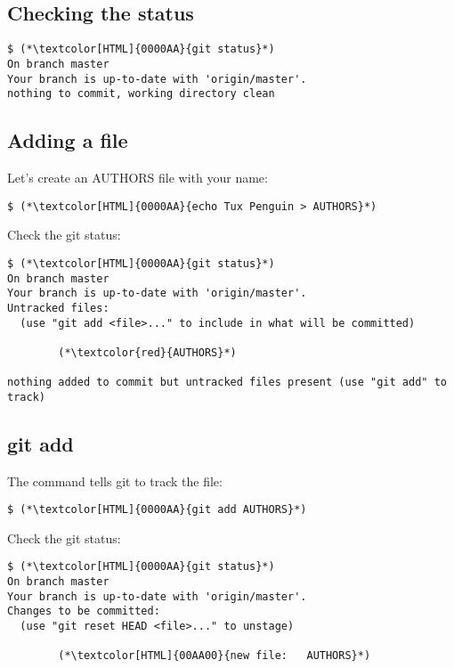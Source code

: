 \subsection{Checking the status}
\begin{frame}[fragile]
  \subslidetitle
  \begin{lstlisting}
$ (*\textcolor[HTML]{0000AA}{git status}*)
On branch master
Your branch is up-to-date with 'origin/master'.
nothing to commit, working directory clean
  \end{lstlisting}
\end{frame}


\subsection{Adding a file}
\begin{frame}[fragile]
  \subslidetitle

  Let's create an AUTHORS file with your name:
  \begin{lstlisting}
$ (*\textcolor[HTML]{0000AA}{echo Tux Penguin > AUTHORS}*)
  \end{lstlisting}

  Check the git status:
  \begin{lstlisting}
$ (*\textcolor[HTML]{0000AA}{git status}*)
On branch master
Your branch is up-to-date with 'origin/master'.
Untracked files:
  (use "git add <file>..." to include in what will be committed)

        (*\textcolor{red}{AUTHORS}*)

nothing added to commit but untracked files present (use "git add" to track)
  \end{lstlisting}

\end{frame}

\subsection{git add}
\begin{frame}[fragile]
  \subslidetitle

  The command  tells git to track the file:
  \begin{lstlisting}
$ (*\textcolor[HTML]{0000AA}{git add AUTHORS}*)
  \end{lstlisting}

  Check the git status:
  \begin{lstlisting}
$ (*\textcolor[HTML]{0000AA}{git status}*)
On branch master
Your branch is up-to-date with 'origin/master'.
Changes to be committed:
  (use "git reset HEAD <file>..." to unstage)

        (*\textcolor[HTML]{00AA00}{new file:   AUTHORS}*)
  \end{lstlisting}
\end{frame}


